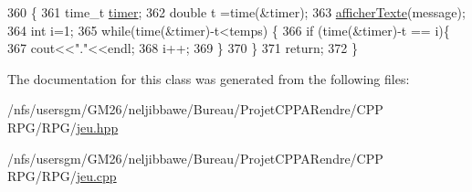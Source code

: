 \begin{DoxyCode}
360                                         \{
361     time\_t \hyperlink{class_jeu_a52ce4fb6c415b45209db13a589c9d675}{timer};
362     \textcolor{keywordtype}{double} t =time(&timer);
363     \hyperlink{class_jeu_aa09fb40439f16b9665a0d76679f78e4e}{afficherTexte}(message);
364     \textcolor{keywordtype}{int} i=1;
365     \textcolor{keywordflow}{while}(time(&timer)-t<temps) \{
366         \textcolor{keywordflow}{if} (time(&timer)-t == i)\{
367             cout<<\textcolor{stringliteral}{"."}<<endl;
368             i++;
369         \}
370     \}
371     \textcolor{keywordflow}{return};
372 \}
\end{DoxyCode}


The documentation for this class was generated from the following files\-:\begin{DoxyCompactItemize}
\item 
/nfs/usersgm/\-G\-M26/neljibbawe/\-Bureau/\-Projet\-C\-P\-P\-A\-Rendre/\-C\-P\-P R\-P\-G/\-R\-P\-G/\hyperlink{jeu_8hpp}{jeu.\-hpp}\item 
/nfs/usersgm/\-G\-M26/neljibbawe/\-Bureau/\-Projet\-C\-P\-P\-A\-Rendre/\-C\-P\-P R\-P\-G/\-R\-P\-G/\hyperlink{jeu_8cpp}{jeu.\-cpp}\end{DoxyCompactItemize}
